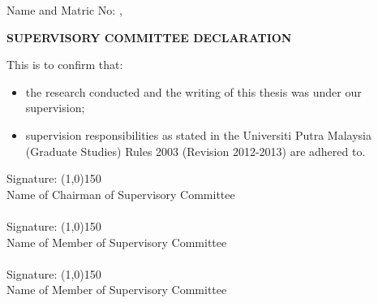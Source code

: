 \noindent Name and Matric No: \underline{ \authorname, \authormatric}

\newpage



\begin{center}
		{\bf SUPERVISORY COMMITTEE DECLARATION}
\end{center}


\vspace{0.2cm}
This is to confirm that:
\begin{itemize}[label={$\bullet$},noitemsep,leftmargin=*,topsep=0pt,partopsep=0pt]
	\vspace{-10pt} 
\item the research conducted and the writing of this thesis was under our supervision;
\item supervision responsibilities as stated in the Universiti Putra Malaysia (Graduate Studies) Rules 2003 (Revision 2012-2013) are adhered to.
\end{itemize}

\vspace{1cm}
Signature: \line(1,0){150} \\
Name of 
Chairman of
Supervisory 
Committee\\ {\bf \chair}\\ 

\vspace{1cm}
Signature: \line(1,0){150} \\
Name of 
Member of
Supervisory
Committee \\ {\bf \memberA}\\

\vspace{1cm}
Signature: \line(1,0){150} \\
Name of 
Member of
Supervisory
Committee\\ {\bf \memberB}\\







